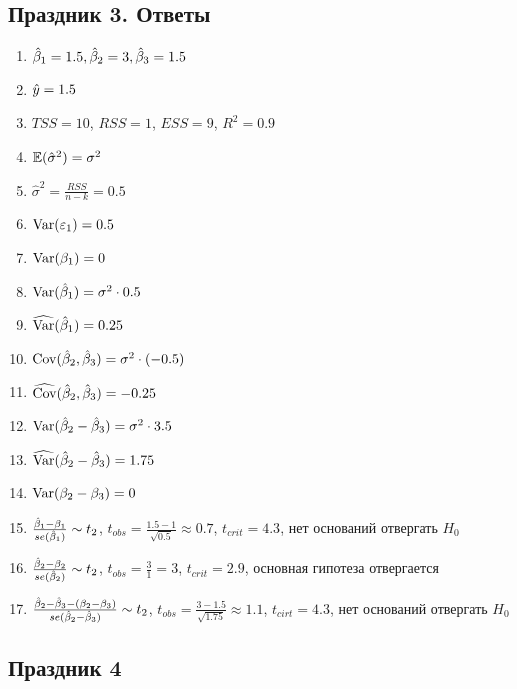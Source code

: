 \documentclass[12pt, a4paper]{article}
\begin{document}
\subsection{Праздник 3. Ответы}
\begin{enumerate}
\item $\hat{\beta}_1 = 1.5, \hat{\beta}_2 = 3, \hat{\beta}_3 = 1.5$
\item $\hat{y} = 1.5$
\item $TSS = 10$, $RSS = 1$, $ESS = 9$, $R^2 = 0.9$
\item $\mathbb{E} (\hat{\sigma}^2) = \sigma^2$
\item $\hat{\sigma}^2 = \frac{RSS}{n-k} = 0.5$
\item $\operatorname{Var}(\varepsilon_1) = 0.5$
\item $\operatorname{Var} (\beta_1) = 0$
\item $\operatorname{Var} (\hat{\beta}_1) = \sigma^2 \cdot 0.5$
\item $\widehat{\operatorname{Var} }(\hat{\beta}_1) = 0.25$
\item $\operatorname{Cov} (\hat{\beta}_2, \hat{\beta}_3) = \sigma^2 \cdot (-0.5)$
\item $\widehat{\operatorname{Cov} }(\hat{\beta}_2, \hat{\beta}_3) = -0.25$
\item $\operatorname{Var} (\hat{\beta}_2 - \hat{\beta}_3) = \sigma^2 \cdot 3.5$
\item $\widehat{\operatorname{Var} }(\hat{\beta}_2 - \hat{\beta}_3) = 1.75$
\item $\operatorname{Var} (\beta_2 - \beta_3) = 0$
\item $\frac{\hat{\beta}_1 - \beta_1}{se(\hat{\beta}_1)} \sim t_2$, $t_{obs} = \frac{1.5-1}{\sqrt{0.5}} \approx 0.7$, $t_{crit} = 4.3$, нет оснований отвергать $H_0$
\item $\frac{\hat{\beta}_2 - \beta_2}{se(\hat{\beta}_2)} \sim t_2$, $t_{obs} = \frac{3}{1} = 3$, $t_{crit} = 2.9$, основная гипотеза отвергается
\item $\frac{\hat{\beta}_2 - \hat{\beta}_3 - (\beta_2 - \beta_3)}{se(\hat{\beta}_2 - \hat{\beta}_3)} \sim t_2$, $t_{obs} = \frac{3-1.5}{\sqrt{1.75}} \approx 1.1$, $t_{cirt} = 4.3$, нет оснований отвергать $H_0$
\end{enumerate}



\subsection{Праздник 4}
\end{document}
